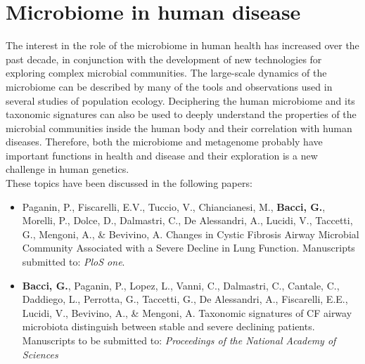 \logvartrue
\chapter{Microbiome in human disease}
The interest in the role of the microbiome in human health has increased over the past decade, in conjunction with the development of new technologies for exploring complex microbial communities. The large-scale dynamics of the microbiome can be described by many of the tools and observations used in several studies of population ecology. Deciphering the human microbiome and its taxonomic signatures can also be used to deeply understand the properties of the microbial communities inside the human body and their correlation with human diseases. Therefore, both the microbiome and metagenome probably have important functions in health and disease and their exploration is a new challenge in human genetics.\\
These topics have been discussed in the following papers:
\vspace{-5mm}
\begin{itemize}
\item Paganin, P., Fiscarelli, E.V., Tuccio, V., Chiancianesi, M., \textbf{Bacci, G.}, Morelli, P., Dolce, D., Dalmastri, C., De Alessandri, A., Lucidi, V., Taccetti, G., Mengoni, A., \& Bevivino, A. Changes in Cystic Fibrosis Airway Microbial Community Associated with a Severe Decline in Lung Function. Manuscripts submitted to: \textit{PloS one}.
\item \textbf{Bacci, G.}, Paganin, P., Lopez, L., Vanni, C., Dalmastri, C., Cantale, C., Daddiego, L., Perrotta, G., Taccetti, G., De Alessandri, A., Fiscarelli, E.E., Lucidi, V., Bevivino, A., \& Mengoni, A. Taxonomic signatures of CF airway microbiota distinguish between stable and severe declining patients. Manuscripts to be  submitted to: \textit{Proceedings of the National Academy of Sciences}
\end{itemize}

